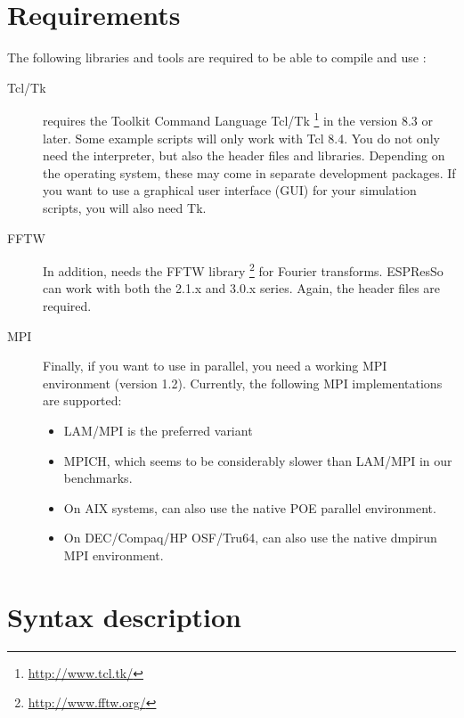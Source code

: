 \section{Requirements}
\label{sec:requirements}

The following libraries and tools are required to be able to compile
and use \es:

\begin{description}
\item[Tcl/Tk]  \es{} requires the Toolkit Command
  Language Tcl/Tk \footnote{\url{http://www.tcl.tk/}} in the version
  8.3 or later.  Some example scripts will only work with Tcl 8.4. You
  do not only need the interpreter, but also the header files and
  libraries.  Depending on the operating system, these may come in
  separate development packages. If you want to use a graphical user
  interface (GUI) for your simulation scripts, you will also need Tk.
  
\item[FFTW]  In addition, \es{} needs the FFTW library
  \footnote{\url{http://www.fftw.org/}} for Fourier transforms.
  ESPResSo can work with both the 2.1.x and 3.0.x series. Again, the
  header files are required.
  
\item[MPI]  Finally, if you want to use \es{} in parallel,
  you need a working MPI environment (version 1.2). Currently, the
  following MPI implementations are supported:
  \begin{itemize}
  \item LAM/MPI is the preferred variant
  \item MPICH, which seems to be considerably slower than LAM/MPI in
    our benchmarks.
  \item On AIX systems, \es{} can also use the native POE parallel
    environment.
  \item On DEC/Compaq/HP OSF/Tru64, \es{} can also use the native
    dmpirun MPI environment.
  \end{itemize}
\end{description}


\section{Syntax description}
\label{sec:syntax}


